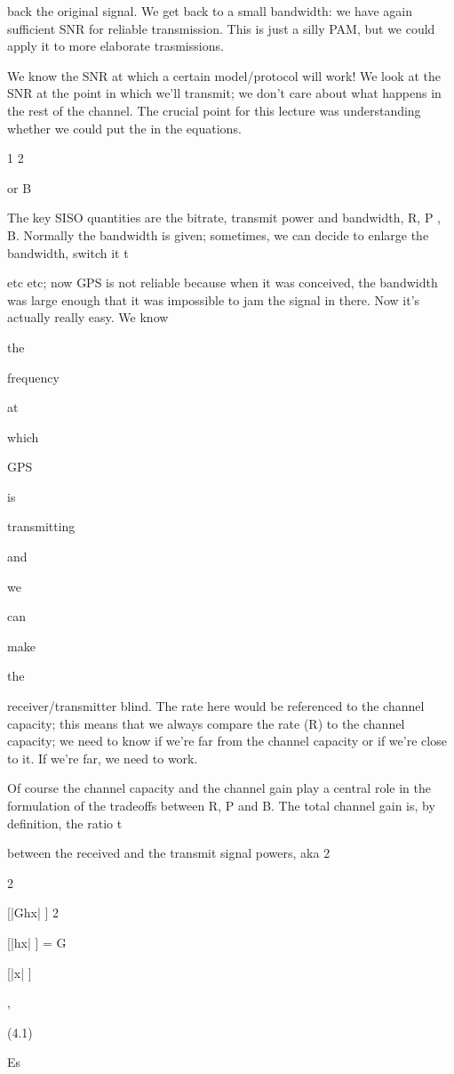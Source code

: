 {{{{{back the original signal. We get back to a small bandwidth: we have again sufficient SNR for reliable transmission.
This is just a silly PAM, but we could apply it to more elaborate trasmissions.

We know the SNR at which a certain model/protocol will work!
We look at the SNR at the point in which we'll transmit; we don't care about what happens in the rest of the channel.
The crucial point for this lecture was understanding whether we could put the in the equations.

1 2

or B

The key SISO quantities are the bitrate, transmit power and bandwidth, R, P , B. Normally the bandwidth is given; sometimes, we can decide to enlarge the bandwidth, switch it t

etc etc; now GPS is not reliable because when it was conceived, the bandwidth was large enough that it was impossible to jam the signal in there. Now it's actually really easy.
We know

the

frequency

at

which

GPS

is

transmitting

and

we

can

make

the

receiver/transmitter blind.
The rate here would be referenced to the channel capacity; this means that we always compare the rate (R) to the channel capacity; we need to know if we're far from the channel capacity or if we're close to it. If we're far, we need to work.

Of course the channel capacity and the channel gain play a central role in the formulation of the tradeoffs between R, P and B. The total channel gain is, by definition, the ratio t

between the received and the transmit signal powers, aka 2

2

[|\sqrt Ghx| ]
2

[|hx| ]
= G

[|x| ]

,

(4.1)

Es

}}}}}
